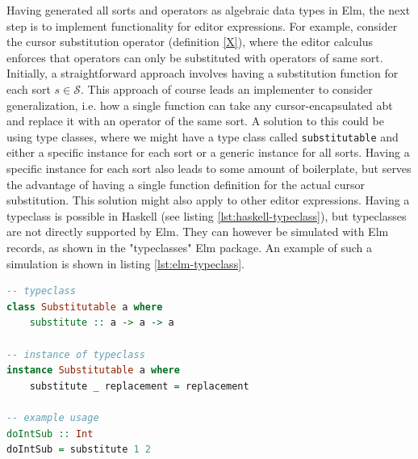 \documentclass{article}
\begin{document}
Having generated all sorts and operators as algebraic data types in Elm, the next step is to implement functionality for editor expressions. For example, consider the cursor substitution operator (definition \ref{X}), where the editor calculus enforces that operators can only be substituted with operators of same sort. Initially, a straightforward approach involves having a substitution function for each sort $s \in \mathcal{S}$. This approach of course leads an implementer to consider generalization, i.e. how a single function can take any cursor-encapsulated abt and replace it with an operator of the same sort. A solution to this could be 
using type classes, where we might have a type class called \texttt{substitutable} and either a specific instance for each sort or a generic instance for all sorts. Having a specific instance for each sort also leads to some amount of boilerplate, but serves the advantage of having a single function definition for the actual cursor substitution. This solution might also apply to other editor expressions.
Having a typeclass is possible in Haskell (see listing \ref{lst:haskell-typeclass}), but typeclasses are not directly supported by Elm. They can however be simulated with Elm records, as shown in the "typeclasses" Elm package\cite{elm-typeclass-package}. An example of such a simulation is shown in listing \ref{lst:elm-typeclass}.

\begin{lstlisting}[language=Haskell,style=inline,caption={Haskell typeclass example},label={lst:haskell-typeclass}]
-- typeclass
class Substitutable a where 
    substitute :: a -> a -> a
    
-- instance of typeclass
instance Substitutable a where
    substitute _ replacement = replacement

-- example usage
doIntSub :: Int
doIntSub = substitute 1 2 
\end{lstlisting}
\end{document}
